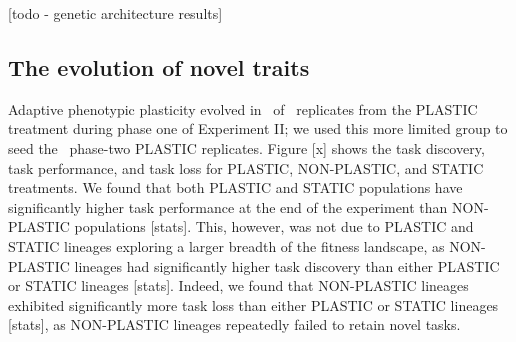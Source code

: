 [todo - genetic architecture results]

\vspace{0.5cm}
\subsection{The evolution of novel traits}





Adaptive phenotypic plasticity evolved in \novelTraitsPlasticReps\ of \novelTraitsReplicates\ replicates from the PLASTIC treatment during phase one of Experiment II; we used this more limited group to seed the \novelTraitsPlasticReps\ phase-two PLASTIC replicates.
Figure [x] shows the task discovery, task performance, and task loss for PLASTIC, NON-PLASTIC, and STATIC treatments.
We found that both PLASTIC and STATIC populations have significantly higher task performance at the end of the experiment than NON-PLASTIC populations [stats].
This, however, was not due to PLASTIC and STATIC lineages exploring a larger breadth of the fitness landscape, as NON-PLASTIC lineages had significantly higher task discovery than either PLASTIC or STATIC lineages [stats].
Indeed, we found that NON-PLASTIC lineages exhibited significantly more task loss than either PLASTIC or STATIC lineages [stats], as NON-PLASTIC lineages repeatedly failed to retain novel tasks.


